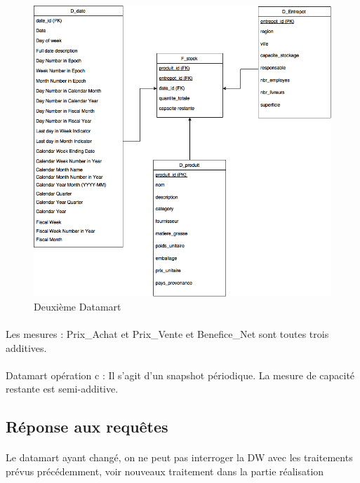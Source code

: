     \begin{figure}[h]
        \centerline{\includegraphics[scale=0.6]{EtoileDM2.png}}
        \caption{Deuxième Datamart}
        \label{fig:UML}
    \end{figure}

\paragraph{} Les mesures : Prix\_Achat et Prix\_Vente et Benefice\_Net sont toutes trois additives.

\paragraph{} 
\paragraph{} Datamart opération c :
Il s’agit d’un snapshot périodique.
La mesure de capacité restante est semi-additive.

\subsection{Réponse aux requêtes} 
\paragraph{} Le datamart ayant changé, on ne peut pas interroger la DW avec les traitements prévus précédemment, voir nouveaux traitement dans la partie réalisation

